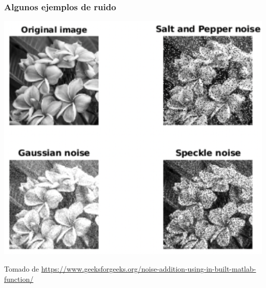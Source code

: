 \documentclass[
10pt, %
aspectratio=169, %
]{beamer}
\begin{document}
	\begin{frame}
		
		\frametitle{Algunos ejemplos de ruido}
		
		\centering
		\includegraphics[scale=0.4]{ruido.png}
		
		{\scriptsize Tomado de \url{https://www.geeksforgeeks.org/noise-addition-using-in-built-matlab-function/}}
		
		
		
		
	\end{frame}
	
\end{document}
